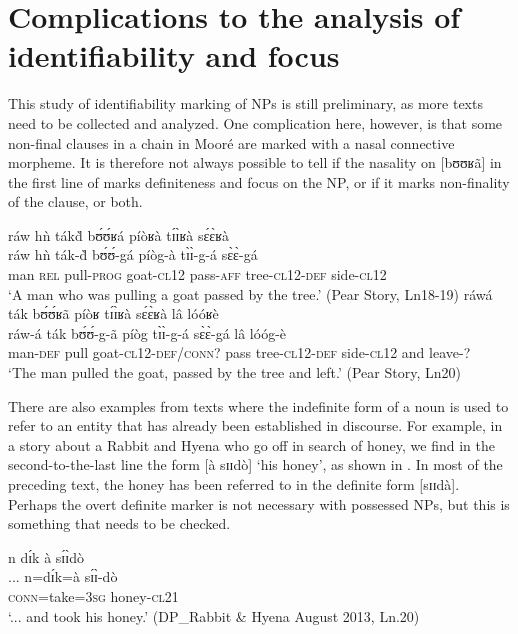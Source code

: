 \documentclass[output=paper]{langsci/langscibook}
\begin{document}
\section{Complications to the analysis of identifiability and focus}\label{sec:teo:7}

This study of identifiability marking of NPs is still preliminary, as more texts need to be collected and analyzed. One complication here, however, is that some non-final clauses in a chain in Mooré are marked with a nasal connective morpheme. It is therefore not always possible to tell if the nasality on [bʊʊʁã] in the first line of  marks definiteness and focus on the NP, or if it marks non-finality of the clause, or both.

\ea\label{ex:teo:57}
\glll ráw hǹ ták\`{d} b\'ʊ\'ʊʁá píòʁà t\'ɪ\`ɪʁà s\'ɛ\`ɛʁà\\
ráw hǹ ták-\`{d} b\'ʊ\'ʊ-gá píòg-à t\`ɪ\`ɪ-g-á s\`ɛ\`ɛ-gá\\
man \textsc{rel} pull-\textsc{prog} goat-\textsc{cl12} pass-\textsc{aff} tree\textsc{-cl12-def} side\textsc{-cl12}{\rmfnm}\\
\glt ‘A man who was pulling a goat passed by the tree.’ (Pear Story, Ln18-19)
\z
{}
\ea\label{ex:teo:58}
\glll ráwá ták b\'ʊ\'ʊʁã píòʁ t\'ɪ\`ɪʁà s\'ɛ\`ɛʁà lâ lóóʁè\\
ráw-á ták b\'ʊ\'ʊ-g-ã píòg t\`ɪ\`ɪ-g-á s\`ɛ\`ɛ-gá lâ lóóg-è\\ 
man-\textsc{def} pull goat-\textsc{cl12-}\textsc{def/conn?} pass tree\textsc{-cl12-def} side\textsc{-cl12} and leave-?\\
\glt ‘The man pulled the goat, passed by the tree and left.’ (Pear Story, Ln20)
\z

There are also examples from texts where the indefinite form of a noun is used to refer to an entity that has already been established in discourse. For example, in a story about a Rabbit and Hyena who go off in search of honey, we find in the second-to-the-last line the form [à sɪɪdò] ‘his honey’, as shown in . In most of the preceding text, the honey has been referred to in the definite form [sɪɪdà]. Perhaps the overt definite marker is not necessary with possessed NPs, but this is something that needs to be checked. 


\ea\label{ex:teo:59}
 n d\'ɪk à s\'ɪ\`ɪdò\\
{...} n=d\'ɪk=à s\'ɪ\`ɪ-dò\\
{}  \textsc{conn}=take=\textsc{3sg} honey-\textsc{cl21}\\
\glt ‘... and took his honey.’ (DP\_Rabbit \& Hyena August 2013, Ln.20)
\z
\end{document}
